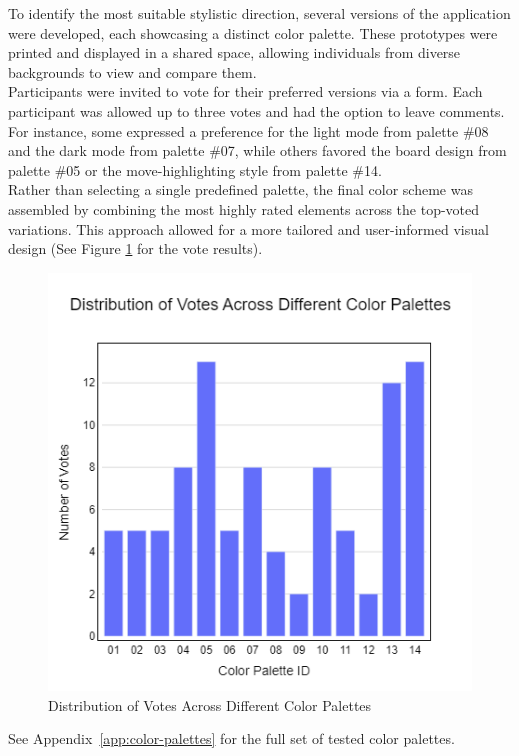 To identify the most suitable stylistic direction, several versions of the application were developed, each showcasing a distinct color palette. These prototypes were printed and displayed in a shared space, allowing individuals from diverse backgrounds to view and compare them. \\

Participants were invited to vote for their preferred versions via a form. Each participant was allowed up to three votes and had the option to leave comments. For instance, some expressed a preference for the light mode from palette \#08 and the dark mode from palette \#07, while others favored the board design from palette \#05 or the move-highlighting style from palette \#14. \\

Rather than selecting a single predefined palette, the final color scheme was assembled by combining the most highly rated elements across the top-voted variations. This approach allowed for a more tailored and user-informed visual design (See Figure \ref{fig:color-palette-results} for the vote results). \\

\begin{figure}[h!]
    \centering
    \includegraphics[width=0.75\linewidth]{figures/methods/color-palette-results.png}
    \caption{Distribution of Votes Across Different Color Palettes}
    \label{fig:color-palette-results}
\end{figure}

See Appendix~\ref{app:color-palettes} for the full set of tested color palettes.

